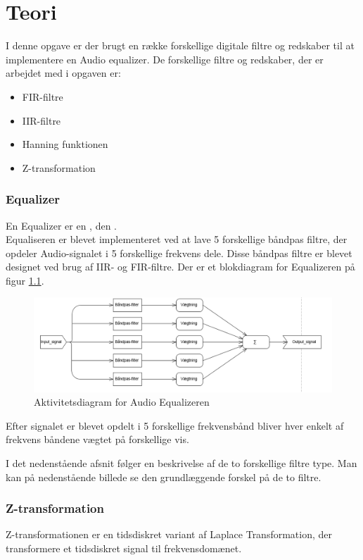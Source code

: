 \chapter{Teori}\label{ch:Teroi}

I denne opgave er der brugt en række forskellige digitale filtre og redskaber til at implementere en Audio equalizer. De forskellige filtre og redskaber, der er arbejdet med i opgaven er:
\begin{itemize}
\item FIR-filtre
\item IIR-filtre
\item Hanning funktionen
\item Z-transformation
\end{itemize}

\subsection{Equalizer}
En Equalizer er en , den .\\
Equaliseren er blevet implementeret ved at lave 5 forskellige båndpas filtre, der opdeler Audio-signalet i 5 forskellige frekvens dele. Disse båndpas filtre er blevet designet ved brug af IIR- og FIR-filtre. 
Der er et blokdiagram for Equalizeren på figur \ref{fig:Aktivitetsdiagram for Equalizeren}.

\begin{figure}[H]
	\centering
	\includegraphics[width=150mm]{figures/Equalizer_flowchart.PNG}
	\caption{Aktivitetsdiagram for Audio Equalizeren}
	\label{fig:Aktivitetsdiagram for Equalizeren}
\end{figure}

Efter signalet er blevet opdelt i 5 forskellige frekvensbånd bliver hver enkelt af frekvens båndene vægtet på forskellige vis.

I det nedenstående afsnit følger en beskrivelse af de to forskellige filtre type. Man kan på nedenstående billede  se den grundlæggende forskel på de to filtre.




\subsection{Z-transformation}
Z-transformationen er en tidsdiskret variant af Laplace Transformation, der transformere et tidsdiskret signal til frekvensdomænet.

